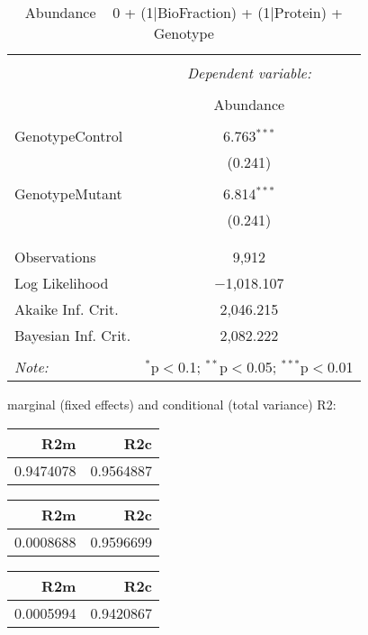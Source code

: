 \documentclass[11pt]{report}
\begin{document}
\begin{table}[!htbp] \centering 
  \caption{Abundance ~ 0 + (1|BioFraction) + (1|Protein) + Genotype} 
  \label{} 
\begin{tabular}{@{\extracolsep{5pt}}lc} 
\\[-1.8ex]\hline 
\hline \\[-1.8ex] 
 & \multicolumn{1}{c}{\textit{Dependent variable:}} \\ 
\cline{2-2} 
\\[-1.8ex] & Abundance \\ 
\hline \\[-1.8ex] 
 GenotypeControl & 6.763$^{***}$ \\ 
  & (0.241) \\ 
  & \\ 
 GenotypeMutant & 6.814$^{***}$ \\ 
  & (0.241) \\ 
  & \\ 
\hline \\[-1.8ex] 
Observations & 9,912 \\ 
Log Likelihood & $-$1,018.107 \\ 
Akaike Inf. Crit. & 2,046.215 \\ 
Bayesian Inf. Crit. & 2,082.222 \\ 
\hline 
\hline \\[-1.8ex] 
\textit{Note:}  & \multicolumn{1}{r}{$^{*}$p$<$0.1; $^{**}$p$<$0.05; $^{***}$p$<$0.01} \\ 
\end{tabular} 
\end{table} 
marginal (fixed effects) and conditional (total variance) R2:

\begin{tabular}{r|r}
\hline
R2m & R2c\\
\hline
0.9474078 & 0.9564887\\
\hline
\end{tabular}

\begin{tabular}{r|r}
\hline
R2m & R2c\\
\hline
0.0008688 & 0.9596699\\
\hline
\end{tabular}

\begin{tabular}{r|r}
\hline
R2m & R2c\\
\hline
0.0005994 & 0.9420867\\
\hline
\end{tabular}
\end{document}
